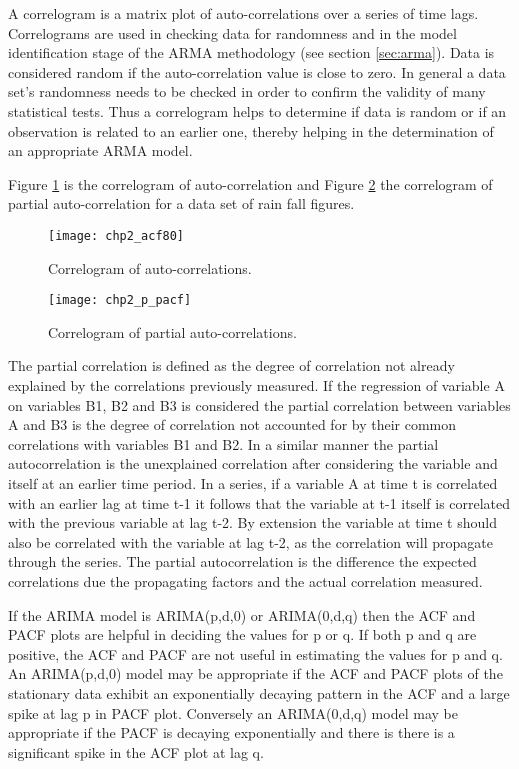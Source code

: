A correlogram is a matrix plot of auto-correlations over a series of time lags.  Correlograms are used in checking data for randomness and in the model identification stage of the ARMA methodology (see section \ref{sec:arma}). Data is considered random if the auto-correlation value is close to zero.  In general a data set's randomness needs to be checked in order to confirm the validity of many statistical tests. Thus a correlogram helps to determine if data is random or if an observation is related to an earlier one, thereby helping in the determination of an appropriate ARMA model. 

Figure \ref{fig:acf80} is the correlogram of auto-correlation and Figure \ref{fig:pacf} the correlogram of partial auto-correlation for a data set of rain fall figures.


\begin{figure}[tbph!]
\centering
\texttt{[image: chp2\_acf80]}
\caption[Correlogram of auto-correlations]{Correlogram of auto-correlations.}
\label{fig:acf80}
\end{figure}

\begin{figure}[tbph!]
\centering
\texttt{[image: chp2\_p\_pacf]}
\caption[Correlogram of partial auto-correlations]{Correlogram of partial auto-correlations.}
\label{fig:pacf}
\end{figure}

The partial correlation is defined as the degree of correlation not already explained by the correlations previously measured. If the regression of variable A on variables B1, B2 and B3 is considered the partial correlation between variables A and B3 is the degree of correlation not accounted for by their common correlations with variables B1 and B2. In a similar manner the partial autocorrelation is the unexplained correlation after considering the variable and itself at an earlier time period. In a series, if a variable A at time t is correlated with an earlier lag at time t-1 it follows that the variable at t-1 itself is correlated with the previous variable at lag t-2. By extension the variable at time t should also be correlated with the variable at lag t-2, as the correlation will propagate through the series. The partial autocorrelation is the difference the expected correlations due the propagating factors and the actual correlation measured.

If the ARIMA model is ARIMA(p,d,0) or ARIMA(0,d,q) then the ACF and PACF plots are helpful in deciding the values for p or q. If both p and q are positive, the ACF and PACF are not useful in estimating the values for p and q. An ARIMA(p,d,0) model may be appropriate if the ACF and PACF plots of the stationary data exhibit an exponentially decaying pattern in the ACF and a large spike at lag p in PACF plot. Conversely an ARIMA(0,d,q) model may be appropriate if the PACF is decaying exponentially and there is there is a significant spike in the ACF plot at lag q.

